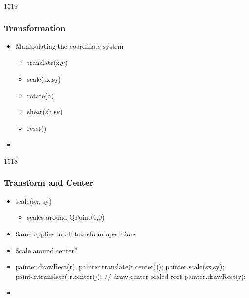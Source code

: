 \begin{slide}{1519}\frametitle{Transformation}
  \begin{itemize}
  \item Manipulating the coordinate system
    \begin{itemize}
    \item translate(x,y)
    \item scale(sx,sy)
    \item rotate(a)
    \item shear(sh,sv)
    \item reset()
    \end{itemize}
 \item[] 
  \end{itemize}
\end{slide}

\begin{slide}[fragile]{1518}\frametitle{Transform and Center}
  \begin{itemize}
  \item scale(sx, sy)
    \begin{itemize}
    \item scales around QPoint(0,0)
    \end{itemize}
  \item Same applies to all transform operations
  \item Scale around center?
  \item [] \begin{cpp}
painter.drawRect(r);
painter.translate(r.center());
painter.scale(sx,sy);
painter.translate(-r.center());
// draw center-scaled rect      
painter.drawRect(r); 
    \end{cpp}
 \item[] 
  \end{itemize}
\end{slide}


